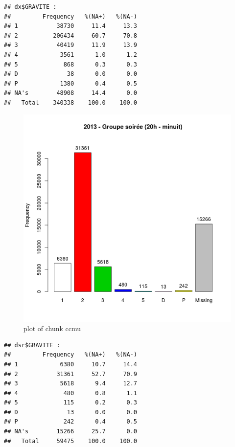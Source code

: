\begin{verbatim}
## dx$GRAVITE : 
##         Frequency   %(NA+)   %(NA-)
## 1           38730     11.4     13.3
## 2          206434     60.7     70.8
## 3           40419     11.9     13.9
## 4            3561      1.0      1.2
## 5             868      0.3      0.3
## D              38      0.0      0.0
## P            1380      0.4      0.5
## NA's        48908     14.4      0.0
##   Total    340338    100.0    100.0
\end{verbatim}

\begin{Shaded}
\begin{Highlighting}[]

 \NormalTok{)}
\end{Highlighting}
\end{Shaded}

\begin{figure}[htbp]
\centering
\includegraphics{figure/ccmu2.png}
\caption{plot of chunk ccmu}
\end{figure}

\begin{verbatim}
## dsr$GRAVITE : 
##         Frequency   %(NA+)   %(NA-)
## 1            6380     10.7     14.4
## 2           31361     52.7     70.9
## 3            5618      9.4     12.7
## 4             480      0.8      1.1
## 5             115      0.2      0.3
## D              13      0.0      0.0
## P             242      0.4      0.5
## NA's        15266     25.7      0.0
##   Total     59475    100.0    100.0
\end{verbatim}

